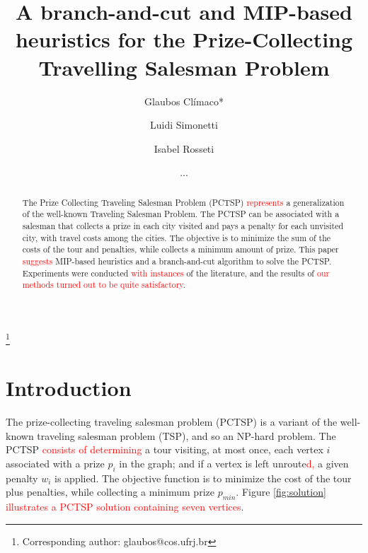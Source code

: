 \documentclass{ro}
\begin{document}
\title{A branch-and-cut and MIP-based heuristics for the Prize-Collecting Travelling Salesman Problem}%
%
\author{Glaubos Cl\'imaco*}\address{Universidade Federal do Rio de Janeiro, PESC-COPPE, Cidade Universit\'aria, Centro de Tecnologia, Bloco H, 21941-972, Rio de Janeiro, Brasil.}\thanks{Corresponding author: glaubos@cos.ufrj.br}
\author{Luidi Simonetti}\address{Universidade Federal do Rio de Janeiro, PESC-COPPE, Cidade Universit\'aria, Centro de Tecnologia, Bloco H, 21941-972, Rio de Janeiro, Brasil.}
\author{Isabel Rosseti}\address{ Universidade Federal Fluminense, Instituto de Computa\c{c}\~ao. Rua Passo da P\'atria 156 S\~ao Domingos 24210-240 - Niter\'oi, RJ - Brasil}
%
\date{...}
%
\begin{abstract} 

The Prize Collecting Traveling Salesman Problem
(PCTSP) \textcolor{red}{represents} a generalization of the well-known Traveling Salesman Problem. The PCTSP can be associated with a salesman that collects a prize in each city visited and pays a penalty for each unvisited city, with travel costs among the cities. The
objective is to minimize the sum of the costs of the tour
and penalties, while collects a minimum amount of prize.
This paper \textcolor{red}{suggests} MIP-based heuristics and a branch-and-cut algorithm to solve the PCTSP. Experiments were conducted \textcolor{red}{with instances} of the literature, and the results of \textcolor{red}{our methods turned out to be quite satisfactory}.

 \end{abstract}
%


%
%
\maketitle
\section{Introduction}

The prize-collecting traveling salesman problem (PCTSP) is a variant of the well-known traveling salesman problem (TSP), and so an NP-hard problem. The PCTSP \textcolor{red}{consists of determining} a tour visiting, at most once, each vertex $i$ associated with a prize $p_i$ in the graph; and if a vertex is left unroute\textcolor{red}{d,} a given penalty $w_i$ is applied. 
The objective function is to minimize the cost of the tour plus penalties, while collecting a minimum prize $p_{min}$. Figure \ref{fig:solution} \textcolor{red}{illustrates a PCTSP solution containing seven vertices}.
\end{document}
